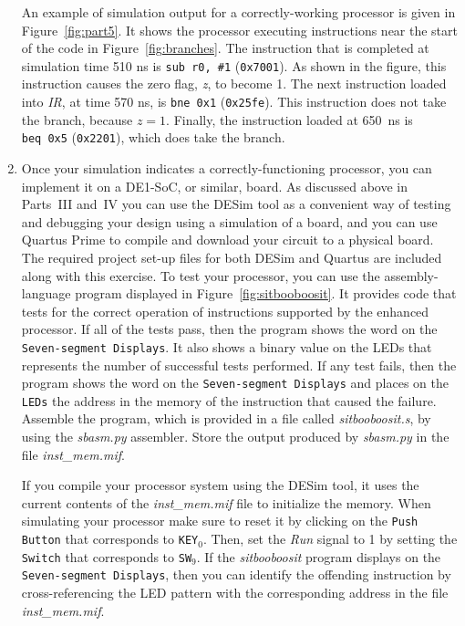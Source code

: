 \documentclass[epsfig,10pt,fullpage]{article} \addtolength{\textwidth}{1.5in}
\newcommand{\red}[1]{{\color{red}\sf{#1}}}
\begin{document}
\begin{enumerate}
An example of simulation output for a correctly-working
processor is given in Figure~\ref{fig:part5}. It shows the processor executing instructions
near the start of the code in Figure~\ref{fig:branches}. The instruction that is completed
at simulation time 510 ns is \texttt{sub r0, \#1} (\texttt{0x7001}). As shown in the figure,
this instruction causes the zero flag, {\it z}, to become 1. The next instruction loaded
into {\it IR}, at time 570 ns, is \texttt{bne 0x1} (\texttt{0x25fe}). This instruction
does not take the branch, because $z = 1$. Finally, the instruction loaded at 650~ns is 
\texttt{beq~0x5} (\texttt{0x2201}), which does take the branch. 

\item Once your simulation indicates a correctly-functioning processor,
you can implement it on a DE1-SoC, or similar, board. As discussed above in Parts~III and~IV
you can use the DESim tool as a convenient way of testing and debugging your design 
using a simulation of a board, and you can use Quartus Prime to compile and download your 
circuit to a physical board.  The required project set-up files for both DESim and Quartus are
included along with this exercise.  To test your processor, 
you can use the assembly-language program displayed in Figure~\ref{fig:sitbooboosit}. It 
provides code that tests for the correct operation of instructions supported by the 
enhanced processor.  If all of the tests pass, then
the program shows the word \texttt{\red{PASSEd}} on the
\texttt{Seven-segment Displays}. It also shows 
a binary value on the LEDs that represents the number of successful tests performed. If any test
fails, then the program shows the word \texttt{\red{FAILEd}} on the
\texttt{Seven-segment Displays} and 
places on the \texttt{LEDs} the address in the memory of the instruction that caused the failure.
Assemble the program, which is provided in a file called {\it sitbooboosit.s}, by using 
the {\it sbasm.py} assembler. Store the output produced by {\it sbasm.py} in the file
{\it inst\_mem.mif}.

If you compile your processor system using the DESim tool, it uses the current 
contents of the {\it inst\_mem.mif} file to initialize the memory. When simulating your 
processor make sure to reset it by clicking on the \texttt{Push Button} that corresponds to
\texttt{KEY}$_0$. Then, set the {\it Run} signal to 1 by setting the \texttt{Switch}
that corresponds to \texttt{SW}$_9$. If the {\it sitbooboosit} program displays
\texttt{\red{FAILEd}} on the
\texttt{Seven-segment Displays}, then you can identify the
offending instruction by cross-referencing the LED pattern with the corresponding address
in the file {\it inst\_mem.mif}.


\end{enumerate}
\end{document}
